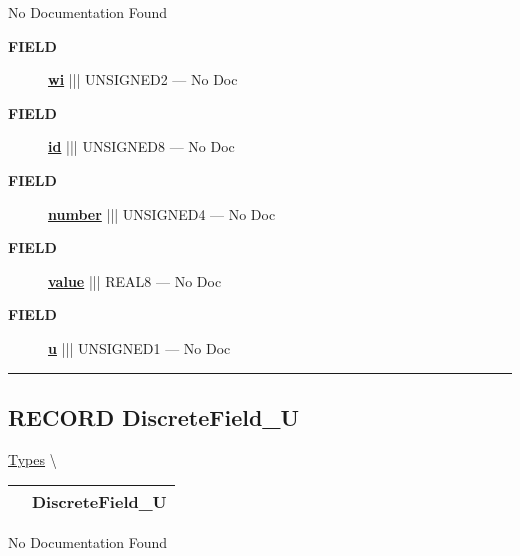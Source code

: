 \par





No Documentation Found







\par
\begin{description}
\item [\colorbox{tagtype}{\color{white} \textbf{\textsf{FIELD}}}] \textbf{\underline{wi}} ||| UNSIGNED2 --- No Doc
\item [\colorbox{tagtype}{\color{white} \textbf{\textsf{FIELD}}}] \textbf{\underline{id}} ||| UNSIGNED8 --- No Doc
\item [\colorbox{tagtype}{\color{white} \textbf{\textsf{FIELD}}}] \textbf{\underline{number}} ||| UNSIGNED4 --- No Doc
\item [\colorbox{tagtype}{\color{white} \textbf{\textsf{FIELD}}}] \textbf{\underline{value}} ||| REAL8 --- No Doc
\item [\colorbox{tagtype}{\color{white} \textbf{\textsf{FIELD}}}] \textbf{\underline{u}} ||| UNSIGNED1 --- No Doc
\end{description}





\rule{\linewidth}{0.5pt}
\subsection*{\textsf{\colorbox{headtoc}{\color{white} RECORD}
DiscreteField\_U}}

\hypertarget{ecldoc:logisticregression.types.discretefield_u}{}
\hspace{0pt} \hyperlink{ecldoc:LogisticRegression.Types}{Types} \textbackslash 

{\renewcommand{\arraystretch}{1.5}
\begin{tabularx}{\textwidth}{|>{\raggedright\arraybackslash}l|X|}
\hline
\hspace{0pt}\mytexttt{\color{red} } & \textbf{DiscreteField\_U} \\
\hline
\end{tabularx}
}

\par





No Documentation Found







